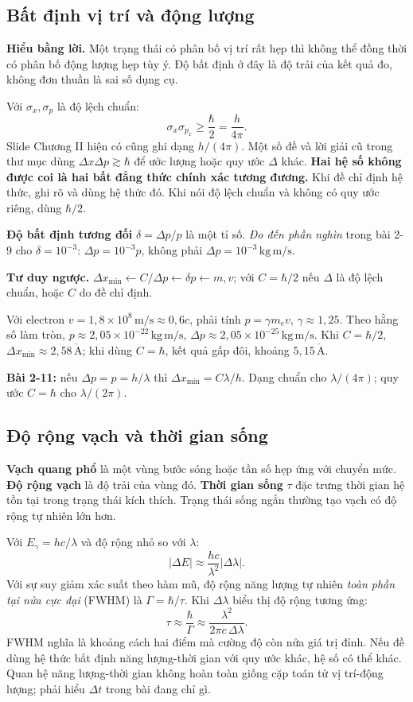 \documentclass[11pt,a4paper]{article}
\newcommand{\unit}[1]{\,\mathrm{#1}}
\newcommand{\idea}[1]{\par\textbf{Hiểu bằng lời.} #1\par}
\newcommand{\think}[1]{\par\textbf{Tư duy ngược.} #1\par}
\begin{document}
\subsection{Bất định vị trí và động lượng}\label{sec:uncertainty}
\idea{Một trạng thái có phân bố vị trí rất hẹp thì không thể đồng thời có
phân bố động lượng hẹp tùy ý. Độ bất định ở đây là độ trải của kết quả đo,
không đơn thuần là sai số dụng cụ.}
Với $\sigma_x,\sigma_p$ là độ lệch chuẩn:
\[
\sigma_x\sigma_{p_x}\ge\frac\hbar2=\frac h{4\pi}.
\]
Slide Chương II hiện có cũng ghi dạng $h/(4\pi)$.
Một số đề và lời giải cũ trong thư mục dùng $\Delta x\Delta p\gtrsim\hbar$
để ước lượng hoặc quy ước $\Delta$ khác. \textbf{Hai hệ số không được coi là
hai bất đẳng thức chính xác tương đương.}
Khi đề chỉ định hệ thức, ghi rõ và dùng hệ thức đó. Khi nói độ lệch chuẩn
và không có quy ước riêng, dùng $\hbar/2$.

\textbf{Độ bất định tương đối} $\delta=\Delta p/p$ là một tỉ số.
\emph{Đo đến phần nghìn} trong bài 2-9 cho $\delta=10^{-3}$:
$\Delta p=10^{-3}p$, không phải $\Delta p=10^{-3}\unit{kg\,m/s}$.

\think{$\Delta x_{\min}\leftarrow C/\Delta p
\leftarrow\delta p\leftarrow m,v$;
với $C=\hbar/2$ nếu $\Delta$ là độ lệch chuẩn, hoặc $C$ do đề chỉ định.}
Với electron $v=1{,}8\times10^8\unit{m/s}\approx0{,}6c$,
phải tính $p=\gamma m_ev$, $\gamma\approx1{,}25$.
Theo hằng số làm tròn, $p\approx2{,}05\times10^{-22}\unit{kg\,m/s}$,
$\Delta p\approx2{,}05\times10^{-25}\unit{kg\,m/s}$.
Khi $C=\hbar/2$, $\Delta x_{\min}\approx2{,}58\unit{\mathring A}$;
khi dùng $C=\hbar$, kết quả gấp đôi, khoảng $5{,}15\unit{\mathring A}$.

\textbf{Bài 2-11:} nếu $\Delta p=p=h/\lambda$ thì
$\Delta x_{\min}=C\lambda/h$.
Dạng chuẩn cho $\lambda/(4\pi)$; quy ước $C=\hbar$ cho $\lambda/(2\pi)$.

\subsection{Độ rộng vạch và thời gian sống}\label{sec:lifetime}
\textbf{Vạch quang phổ} là một vùng bước sóng hoặc tần số hẹp ứng với
chuyển mức. \textbf{Độ rộng vạch} là độ trải của vùng đó.
\textbf{Thời gian sống} $\tau$ đặc trưng thời gian hệ tồn tại trong trạng thái kích thích.
Trạng thái sống ngắn thường tạo vạch có độ rộng tự nhiên lớn hơn.

Với $E_\gamma=hc/\lambda$ và độ rộng nhỏ so với $\lambda$:
\[
|\Delta E|\approx\frac{hc}{\lambda^2}|\Delta\lambda|.
\]
Với sự suy giảm xác suất theo hàm mũ, độ rộng năng lượng tự nhiên
\emph{toàn phần tại nửa cực đại} (FWHM) là $\Gamma=\hbar/\tau$.
Khi $\Delta\lambda$ biểu thị độ rộng tương ứng:
\[
\tau\approx\frac\hbar\Gamma
\approx\frac{\lambda^2}{2\pi c\,\Delta\lambda}.
\]
FWHM nghĩa là khoảng cách hai điểm mà cường độ còn nửa giá trị đỉnh.
Nếu đề dùng hệ thức bất định năng lượng-thời gian với quy ước khác,
hệ số có thể khác. Quan hệ năng lượng-thời gian không hoàn toàn giống
cặp toán tử vị trí-động lượng; phải hiểu $\Delta t$ trong bài đang chỉ gì.
\end{document}
